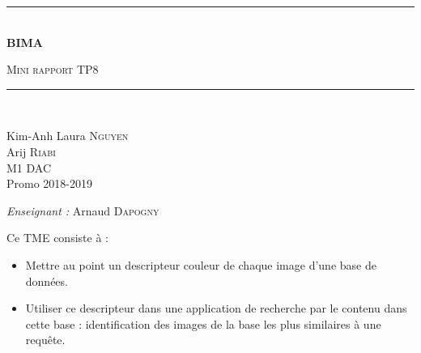 \documentclass[a4paper]{article}
\newcommand{\HRule}{\rule{\linewidth}{0.5mm}}
\begin{document}
\begin{titlepage}
  \begin{center}


      \vspace{4cm}
    \HRule \\[0.4cm]
    { \huge \bfseries BIMA\\[0.4cm] }

      \textsc{\LARGE Mini rapport TP8}\\[0.4cm]

    \HRule \\[0.8cm]

    \begin{minipage}{0.4\textwidth}
      \begin{flushleft} \large
        Kim-Anh Laura \textsc{Nguyen}\\
        \large
        Arij \textsc{Riabi}\\
        M1 DAC\\
        Promo 2018-2019 \\
      \end{flushleft}
    \end{minipage}
    \begin{minipage}{0.5\textwidth}
      \begin{flushright} \large
        \emph{Enseignant :} Arnaud \textsc{Dapogny}\\
      \end{flushright}
    \end{minipage}

      \vspace{2cm}

  \end{center}
\end{titlepage}

\newpage

Ce TME consiste à :
\begin{itemize}
    \item Mettre au point un descripteur couleur de chaque image d’une base de données.
    \item Utiliser ce descripteur dans une application de recherche par le contenu dans cette base :
identification des images de la base les plus similaires à une requête.
\end{itemize}
\end{document}
